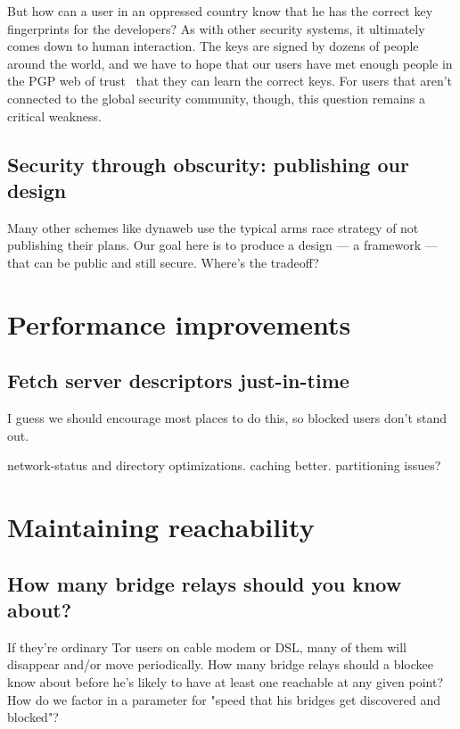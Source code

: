 \documentclass{llncs}
\begin{document}
But how can a user in an oppressed country know that he has the correct
key fingerprints for the developers? As with other security systems, it
ultimately comes down to human interaction. The keys are signed by dozens
of people around the world, and we have to hope that our users have met
enough people in the PGP web of trust~\cite{pgp-wot} that they can learn
the correct keys. For users that aren't connected to the global security
community, though, this question remains a critical weakness.


\subsection{Security through obscurity: publishing our design}

Many other schemes like dynaweb use the typical arms race strategy of
not publishing their plans. Our goal here is to produce a design ---
a framework --- that can be public and still secure. Where's the tradeoff?

\section{Performance improvements}
\label{sec:performance}

\subsection{Fetch server descriptors just-in-time}

I guess we should encourage most places to do this, so blocked
users don't stand out.


network-status and directory optimizations. caching better. partitioning
issues?

\section{Maintaining reachability}

\subsection{How many bridge relays should you know about?}

If they're ordinary Tor users on cable modem or DSL, many of them will
disappear and/or move periodically. How many bridge relays should a
blockee know
about before he's likely to have at least one reachable at any given point?
How do we factor in a parameter for "speed that his bridges get discovered
and blocked"?
\end{document}
